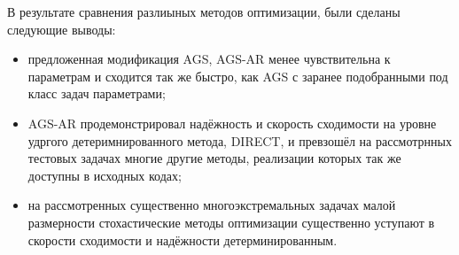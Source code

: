 В результате сравнения разлиыных методов оптимизации, были сделаны следующие выводы:
\begin{itemize}
  \item предложенная модификация AGS, AGS-AR менее чувствительна к параметрам и сходится так же быстро, как AGS
  с заранее подобранными под класс задач параметрами;
  \item AGS-AR продемонстрировал надёжность и скорость сходимости на уровне удргого детеримнированного метода, DIRECT,
  и превзошёл на рассмотрнных тестовых задачах многие другие методы, реализации которых так же доступны в исходных кодах;
  \item на рассмотренных существенно многоэкстремальных задачах малой размерности стохастические методы оптимизации
  существенно уступают в скорости сходимости и надёжности детерминированным.
\end{itemize}
